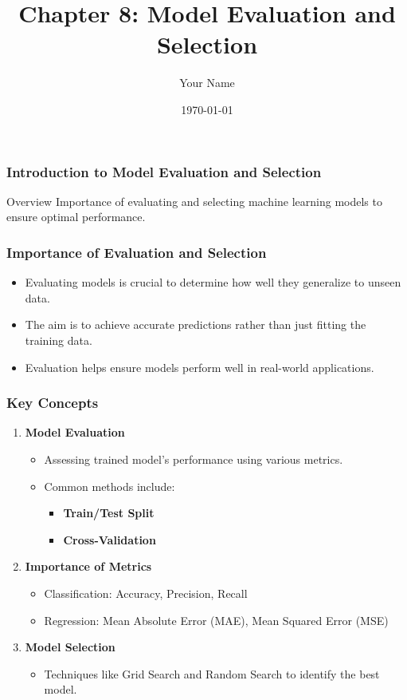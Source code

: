 \documentclass{beamer}
\title{Chapter 8: Model Evaluation and Selection}
\author{Your Name}
\institute{Your Institution}
\date{\today}
\begin{document}
\frame{\titlepage}

\begin{frame}[fragile]
    \frametitle{Introduction to Model Evaluation and Selection}
    \begin{block}{Overview}
        Importance of evaluating and selecting machine learning models to ensure optimal performance.
    \end{block}
\end{frame}

\begin{frame}[fragile]
    \frametitle{Importance of Evaluation and Selection}
    \begin{itemize}
        \item Evaluating models is crucial to determine how well they generalize to unseen data.
        \item The aim is to achieve accurate predictions rather than just fitting the training data.
        \item Evaluation helps ensure models perform well in real-world applications.
    \end{itemize}
\end{frame}

\begin{frame}[fragile]
    \frametitle{Key Concepts}
    \begin{enumerate}
        \item \textbf{Model Evaluation}
            \begin{itemize}
                \item Assessing trained model's performance using various metrics.
                \item Common methods include:
                    \begin{itemize}
                        \item \textbf{Train/Test Split}
                        \item \textbf{Cross-Validation}
                    \end{itemize}
            \end{itemize}
        \item \textbf{Importance of Metrics}
            \begin{itemize}
                \item Classification: Accuracy, Precision, Recall
                \item Regression: Mean Absolute Error (MAE), Mean Squared Error (MSE)
            \end{itemize}
        \item \textbf{Model Selection}
            \begin{itemize}
                \item Techniques like Grid Search and Random Search to identify the best model.
            \end{itemize}
    \end{enumerate}
\end{frame}
\end{document}
